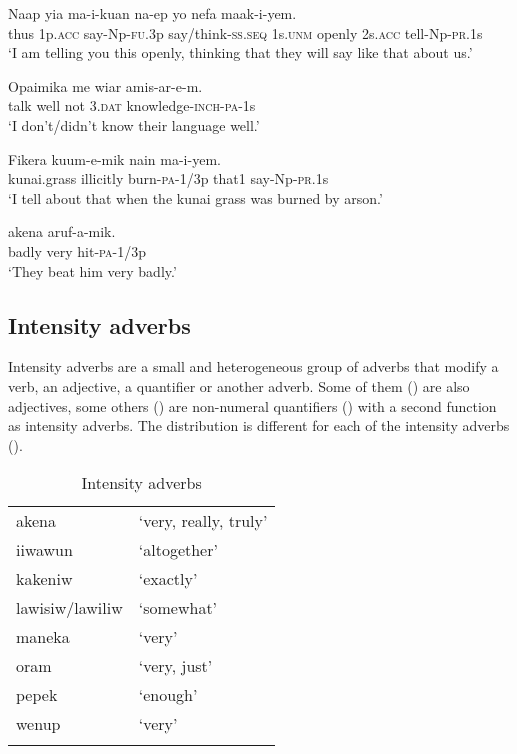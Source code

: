 \ea%
\label{ex:x704}
\gll Naap yia ma-i-kuan na-ep yo  nefa maak-i-yem.\\
thus 1p.\textsc{acc} say-Np-\textsc{fu}.3p say/think-\textsc{ss}.\textsc{seq} 1s.\textsc{unm} openly 2s.\textsc{acc} tell-Np-\textsc{pr}.1s\\
\glt`I am telling you this openly, thinking that they will say like that about us.'
\z

\ea%
\label{ex:x505}
\gll Opaimika  me wiar amis-ar-e-m. \\
talk well not 3.\textsc{dat} knowledge-\textsc{inch}-\textsc{pa}-1s\\
\glt`I don't/didn't know their language well.'
\z

\ea%
\label{ex:x507}
\gll Fikera  kuum-e-mik nain ma-i-yem. \\
kunai.grass illicitly burn-\textsc{pa}-1/3p that1 say-Np-\textsc{pr}.1s\\
\glt`I tell about that when the kunai grass was burned by arson.'
\z

\ea%
\label{ex:x506}
\gll {} akena aruf-a-mik. \\
badly very hit-\textsc{pa}-1/3p\\
\glt`They beat him very badly.'
\z

\subsection{Intensity adverbs}
{}
Intensity adverbs are a small and heterogeneous group of adverbs that modify a verb, an adjective, a quantifier or another adverb. Some of them () are also adjectives, some others () are non-numeral quantifiers () with a second function as intensity adverbs. The distribution is different for each of the intensity adverbs ().

\begin{table}
\begin{tabular}{ll}
\mytoprule
akena &`very, really, truly'\\
iiwawun &`altogether'\\
kakeniw &`exactly'\\
lawisiw/lawiliw &`somewhat'\\
maneka &`very'\\
oram &`very, just'\\
pepek &`enough'\\
wenup &`very'\\
\mybottomrule
\end{tabular}
\caption{Intensity adverbs}
\label{tab:3:intensityadverbs}
\end{table}

